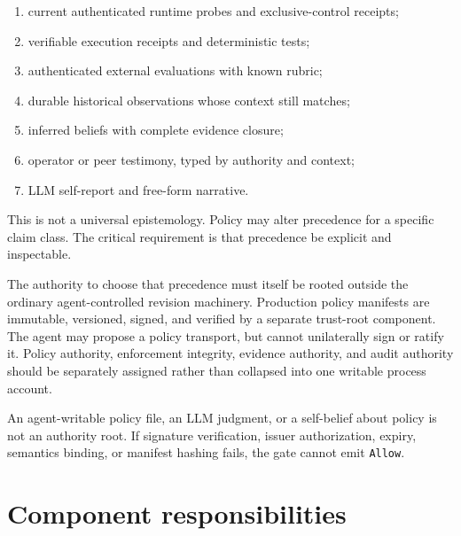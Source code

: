 \documentclass[11pt,oneside]{report}
\begin{document}
\begin{enumerate}
  \item current authenticated runtime probes and exclusive-control receipts;
  \item verifiable execution receipts and deterministic tests;
  \item authenticated external evaluations with known rubric;
  \item durable historical observations whose context still matches;
  \item inferred beliefs with complete evidence closure;
  \item operator or peer testimony, typed by authority and context;
  \item LLM self-report and free-form narrative.
\end{enumerate}

This is not a universal epistemology. Policy may alter precedence for a specific claim class. The critical requirement is that precedence be explicit and inspectable.

The authority to choose that precedence must itself be rooted outside the ordinary agent-controlled revision machinery. Production policy manifests are immutable, versioned, signed, and verified by a separate trust-root component. The agent may propose a policy transport, but cannot unilaterally sign or ratify it. Policy authority, enforcement integrity, evidence authority, and audit authority should be separately assigned rather than collapsed into one writable process account.

\begin{cautionbox}
An agent-writable policy file, an LLM judgment, or a self-belief about policy is not an authority root. If signature verification, issuer authorization, expiry, semantics binding, or manifest hashing fails, the gate cannot emit \texttt{Allow}.
\end{cautionbox}

\section{Component responsibilities}
\end{document}
